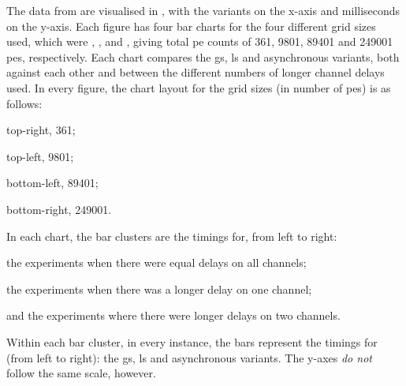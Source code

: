 The data from  are visualised in , with the variants on the x-axis and milliseconds on the y-axis.  Each figure has four bar charts for the four different grid sizes used, which were , ,  and , giving total \gls{pe} counts of \num{361}, \num{9 801}, \num{89 401} and \num{249 001} \glspl{pe}, respectively.  Each chart compares the \gls{gs}, \gls{ls} and asynchronous variants, both against each other and between the different numbers of longer channel delays used.  In every figure, the chart layout for the grid sizes (in number of \glspl{pe}) is as follows:
\begin{inparablank}
\item top-right, \num{361};
\item top-left, \num{9 801};
\item bottom-left, \num{89 401};
\item bottom-right, \num{249 001}.
\end{inparablank}
In each chart, the bar clusters are the timings for, from left to right:
\begin{inparaenum}[a)]
\item the experiments when there were equal delays on all channels;
\item the experiments when there was a longer delay on one channel;
\item and the experiments where there were longer delays on two channels.
\end{inparaenum}
Within each bar cluster, in every instance, the bars represent the timings for (from left to right):  the \gls{gs}, \gls{ls} and asynchronous variants.  The y-axes \emph{do not} follow the same scale, however.

